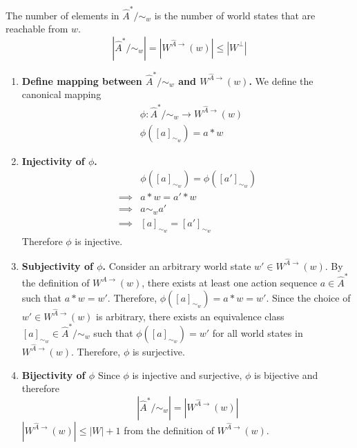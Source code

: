 \begin{propositionE}\label{prp:local_algebra_cardinality}
The number of elements in $\hat{A}^{*}/\sim_{w}$ is the number of world states that are reachable from $w$.
    \begin{equation}
        |\hat{A}^{*}/\sim_{w}| = |W^{\hat{A}\to}(w)| \leq |W^{\bot}|
    \end{equation}
\end{propositionE}
\begin{proofE}
\begin{enumerate}
    \item \textbf{Define mapping between $\hat{A}^{*}/\sim_{w}$ and $W^{\hat{A}\to}(w)$.}
    We define the canonical mapping
    \begin{equation}
    \begin{aligned}
        & \phi: \hat{A}^{*}/\sim_{w} \to W^{\hat{A}\to}(w) \\
        & \phi([a]_{\sim_{w}}) = a \ast w
    \end{aligned}
    \end{equation}

    \item \textbf{Injectivity of $\phi$.}
    \begin{align}
        & \phi([a]_{\sim_{w}}) = \phi([a']_{\sim_{w}}) \\
        \implies & a \ast w = a' \ast w \\
        \implies & a \sim_{w} a' \\
        \implies & [a]_{\sim_{w}} = [a']_{\sim_{w}}
    \end{align}
    Therefore $\phi$ is injective.

    \item \textbf{Subjectivity of $\phi$.}
    Consider an arbitrary world state $w' \in W^{\hat{A}\to}(w)$.
    By the definition of $W^{\hat{A}\to}(w)$, there exists at least one action sequence $a \in \hat{A}^{*}$ such that $a \ast w = w'$.
    Therefore, $\phi([a]_{\sim_{w}}) = a \ast w = w'$.
    Since the choice of $w' \in W^{\hat{A}\to}(w)$ is arbitrary, there exists an equivalence class $[a]_{\sim_{w}} \in \hat{A}^{*}/\sim_{w}$ such that $\phi([a]_{\sim_{w}}) = w'$ for all world states in $W^{\hat{A}\to}(w)$.
    Therefore, $\phi$ is surjective.

    \item \textbf{Bijectivity of $\phi$}
    Since $\phi$ is injective and surjective, $\phi$ is bijective and therefore
    \begin{equation}
        |\hat{A}^{*}/\sim_{w}| = |W^{\hat{A}\to}(w)|
    \end{equation}
    $|W^{\hat{A}\to}(w)| \leq |W| + 1$ from the definition of $W^{\hat{A}\to}(w)$.
\end{enumerate}
\end{proofE}

